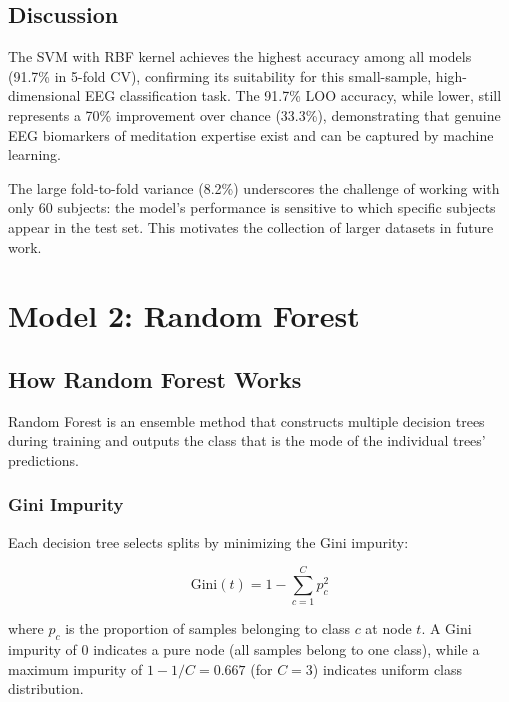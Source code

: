 \documentclass[12pt,a4paper]{article}
\begin{document}
\subsection{Discussion}

The SVM with RBF kernel achieves the highest accuracy among all models (91.7\% in 5-fold CV), confirming its suitability for this small-sample, high-dimensional EEG classification task. The 91.7\% LOO accuracy, while lower, still represents a 70\% improvement over chance (33.3\%), demonstrating that genuine EEG biomarkers of meditation expertise exist and can be captured by machine learning.

The large fold-to-fold variance (8.2\%) underscores the challenge of working with only 60 subjects: the model's performance is sensitive to which specific subjects appear in the test set. This motivates the collection of larger datasets in future work.

\section{Model 2: Random Forest}
\label{sec:rf}

\subsection{How Random Forest Works}

Random Forest is an ensemble method that constructs multiple decision trees during training and outputs the class that is the mode of the individual trees' predictions.

\subsubsection{Gini Impurity}

Each decision tree selects splits by minimizing the Gini impurity:

\begin{equation}
\text{Gini}(t) = 1 - \sum_{c=1}^{C} p_c^2
\label{eq:gini}
\end{equation}

where $p_c$ is the proportion of samples belonging to class $c$ at node $t$. A Gini impurity of 0 indicates a pure node (all samples belong to one class), while a maximum impurity of $1 - 1/C = 0.667$ (for $C=3$) indicates uniform class distribution.
\end{document}
